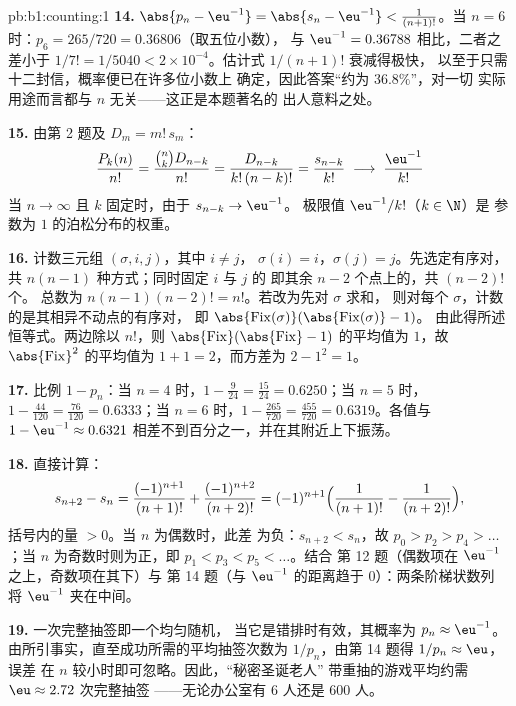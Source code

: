 \begin{solution}{pb:b1:counting:1}
\textbf{14.} $\abs{p_n - \eu^{-1}} = \abs{s_n - \eu^{-1}} <
\frac1{(n+1)!}$。当 $n = 6$ 时：$p_6 = 265/720 = 0.36806$（取五位小数），
与 $\eu^{-1} = 0.36788$ 相比，二者之差小于 $1/7! =
1/5040 < 2 \times 10^{-4}$。估计式 $1/(n+1)!$ 衰减得极快，
以至于只需十二封信，概率便已在许多位小数上
确定，因此答案“约为 $36.8\%$”，对一切
实际用途而言都与 $n$ 无关——这正是本题著名的
出人意料之处。

\textbf{15.} 由第 2 题及 $D_m = m!\,s_m$：
\[
\frac{P_k(n)}{n!} = \frac{\binom nk D_{n-k}}{n!}
= \frac{D_{n-k}}{k!\,(n-k)!} = \frac{s_{n-k}}{k!}
\;\longrightarrow\; \frac{\eu^{-1}}{k!}
\]
当 $n \to \infty$ 且 $k$ 固定时，由于 $s_{n-k} \to \eu^{-1}$。
极限值 $\eu^{-1}/k!$（$k \in \N$）是
参数为 $1$ 的泊松分布的权重。

\textbf{16.} 计数三元组 $(\sigma, i, j)$，其中 $i \neq j$，
$\sigma(i) = i$，$\sigma(j) = j$。先选定有序对，
共 $n(n-1)$ 种方式；同时固定 $i$ 与 $j$ 的
即其余 $n - 2$ 个点上的，共 $(n-2)!$ 个。
总数为 $n(n-1)(n-2)! = n!$。若改为先对 $\sigma$ 求和，
则对每个 $\sigma$，计数的是其相异不动点的有序对，
即 $\abs{\mathrm{Fix}(\sigma)}(\abs{\mathrm{Fix}(\sigma)}-1)$。
由此得所述恒等式。两边除以 $n!$，则
$\abs{\mathrm{Fix}}(\abs{\mathrm{Fix}} - 1)$ 的平均值为 $1$，故
$\abs{\mathrm{Fix}}^2$ 的平均值为 $1 + 1 = 2$，而方差为 $2 -
1^2 = 1$。

\textbf{17.} 比例 $1 - p_n$：当 $n = 4$ 时，$1 - \frac
9{24} = \frac{15}{24} = 0.6250$；当 $n = 5$ 时，$1 - \frac{44}{120} =
\frac{76}{120} = 0.6333$；当 $n = 6$ 时，$1 - \frac{265}{720} =
\frac{455}{720} = 0.6319$。各值与 $1 - \eu^{-1}
\approx 0.6321$ 相差不到百分之一，并在其附近上下振荡。

\textbf{18.} 直接计算：
\[
s_{n+2} - s_n = \frac{(-1)^{n+1}}{(n+1)!} +
\frac{(-1)^{n+2}}{(n+2)!}
= (-1)^{n+1}\Bigl(\frac1{(n+1)!} - \frac1{(n+2)!}\Bigr),
\]
括号内的量 $> 0$。当 $n$ 为偶数时，此差
为负：$s_{n+2} < s_n$，故 $p_0 > p_2 > p_4 > \dots$；当 $n$
为奇数时则为正，即 $p_1 < p_3 < p_5 < \dots$。结合
第 12 题（偶数项在 $\eu^{-1}$ 之上，奇数项在其下）与
第 14 题（与 $\eu^{-1}$ 的距离趋于 $0$）：两条阶梯状数列
将 $\eu^{-1}$ 夹在中间。

\textbf{19.} 一次完整抽签即一个均匀随机，
当它是错排时有效，其概率为 $p_n \approx \eu^{-1}$。
由所引事实，直至成功所需的平均抽签次数为
$1/p_n$，由第 14 题得 $1/p_n \approx \eu$，误差
在 $n$ 较小时即可忽略。因此，“秘密圣诞老人”
带重抽的游戏平均约需 $\eu \approx 2.72$ 次完整抽签
——无论办公室有 $6$ 人还是 $600$ 人。


\end{solution}
